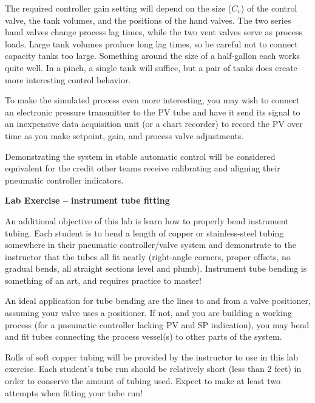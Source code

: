 The required controller gain setting will depend on the size ($C_v$) of the control valve, the tank volumes, and the positions of the hand valves.  The two series hand valves change process lag times, while the two vent valves serve as process loads.  Large tank volumes produce long lag times, so be careful not to connect capacity tanks too large.  Something around the size of a half-gallon each works quite well.  In a pinch, a single tank will suffice, but a pair of tanks does create more interesting control behavior.

To make the simulated process even more interesting, you may wish to connect an electronic pressure transmitter to the PV tube and have it send its signal to an inexpensive data acquisition unit (or a chart recorder) to record the PV over time as you make setpoint, gain, and process valve adjustments.

\vskip 10pt

Demonstrating the system in stable automatic control will be considered equivalent for the credit other teams receive calibrating and aligning their pneumatic controller indicators.



\vfil \eject

\noindent
{\bf Lab Exercise -- instrument tube fitting}

\vskip 5pt

An additional objective of this lab is learn how to properly bend instrument tubing.  Each student is to bend a length of copper or stainless-steel tubing somewhere in their pneumatic controller/valve system and demonstrate to the instructor that the tubes all fit neatly (right-angle corners, proper offsets, no gradual bends, all straight sections level and plumb).  Instrument tube bending is something of an art, and requires practice to master!

An ideal application for tube bending are the lines to and from a valve positioner, assuming your valve uses a positioner.  If not, and you are building a working process (for a pneumatic controller lacking PV and SP indication), you may bend and fit tubes connecting the process vessel(s) to other parts of the system.

Rolls of soft copper tubing will be provided by the instructor to use in this lab exercise.  Each student's tube run should be relatively short (less than 2 feet) in order to conserve the amount of tubing used.  Expect to make at least two attempts when fitting your tube run!

